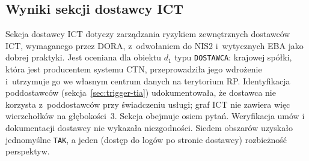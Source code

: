 \subsection{Wyniki sekcji dostawcy ICT}

Sekcja dostawcy ICT dotyczy zarządzania ryzykiem zewnętrznych dostawców ICT, wymaganego przez DORA, z~odwołaniem do NIS2 i~wytycznych EBA jako dobrej praktyki. Jest oceniana dla obiektu $d_1$ typu \texttt{DOSTAWCA}: krajowej spółki, która jest producentem systemu CTN, przeprowadziła jego wdrożenie i~utrzymuje go we własnym centrum danych na terytorium RP. Identyfikacja poddostawców (sekcja~\ref{sec:trigger-tia}) udokumentowała, że dostawca nie korzysta z~poddostawców przy świadczeniu usługi; graf ICT nie zawiera więc wierzchołków na głębokości~3. Sekcja obejmuje osiem pytań. Weryfikacja umów i dokumentacji dostawcy nie wykazała niezgodności. Siedem obszarów uzyskało jednomyślne \texttt{TAK}, a jeden (dostęp do logów po stronie dostawcy) rozbieżność perspektyw.

